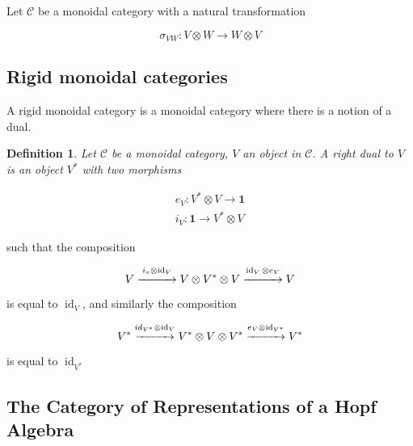 \documentclass[]{article}
\newtheorem{defn}[theorem]{Definition}
\newcommand{\id}{\operatorname{id}}
\numberwithin{equation}{subsection}
\begin{document}
Let $\mathcal{C}$ be a monoidal category with a natural transformation 

\begin{equation}
    \sigma_{VW} : V \otimes W \to W \otimes V
\end{equation}


\subsection{Rigid monoidal categories}
A rigid monoidal category is a monoidal category where there is a notion of a dual. 

\begin{defn}
    Let $\mathcal{C}$ be a monoidal category, $V$ an object in $\mathcal{C}$. A \emph{right dual} to $V$ is an object $V^*$ with two morphisms

    \begin{align}
        e_V: V^* \otimes V \to \mathbf{1}  \\
        i_V: \mathbf{1} \to V^* \otimes V
    \end{align}
\end{defn}

such that the composition

\begin{equation}
    V \stackrel{i_v \otimes \id_V}{\xrightarrow{\hspace*{1cm}}} V \otimes V^*
    \otimes V  \stackrel{\id_V \otimes e_V}{\xrightarrow{\hspace*{1cm}}} V
\end{equation}

is equal to $\id_V$, and similarly the composition

\begin{equation}
    V^* \stackrel{id_{V^*} \otimes \id_V}{\xrightarrow{\hspace*{1cm}}} V^*
    \otimes V \otimes V^*  \stackrel{e_V \otimes
    \id_{V^*}}{\xrightarrow{\hspace*{1cm}}} V^*
\end{equation}

is equal to $\id_{V^*}$


\subsection{The Category of Representations of a Hopf Algebra}
\end{document}
